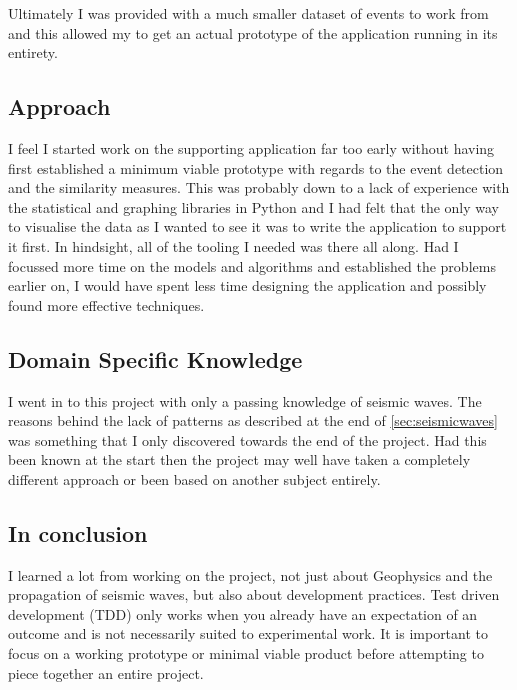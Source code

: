 \documentclass[../report.tex]{subfiles}
\begin{document}
	Ultimately I was provided with a much smaller dataset of events to work from and this allowed my to get an actual 
	prototype of the application running in its entirety.
	
\subsection{Approach}

	I feel I started work on the supporting application far too early without having first established a minimum viable prototype with regards to the event detection and the similarity measures.  This was probably down to a lack of experience with the statistical and graphing libraries in Python and I had felt that the only way to visualise the data as I wanted to see it was to write the application to support it first.  In hindsight, all of the tooling I needed was there all along.  Had I focussed more time on the models and algorithms and established the problems earlier on, I would have spent less time designing the application and possibly found more effective techniques.
	
\subsection{Domain Specific Knowledge}

	I went in to this project with only a passing knowledge of seismic waves.  The reasons behind the lack of patterns as described at the end of \cref{sec:seismicwaves} was something that I only discovered towards the end of the project.  Had this been known at the start then the project may well have taken a completely different approach or been based on another subject entirely.
	
\subsection{In conclusion}

	I learned a lot from working on the project, not just about Geophysics and the propagation of seismic waves, but also about development practices.  Test driven development (TDD) only works when you already have an expectation of an outcome and is not necessarily suited to experimental work.  It is important to focus on a working prototype or minimal viable product before attempting to piece together an entire project.
	
\end{document}
